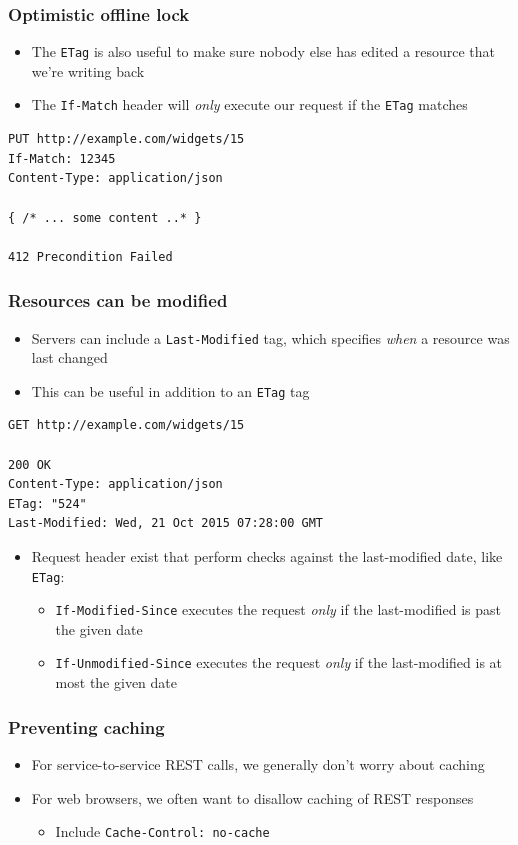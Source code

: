 \documentclass[8pt]{article}
\begin{document}
\subsubsection{Optimistic offline lock}
\label{sec:orgde41bcb}
\begin{itemize}
\item The \texttt{ETag} is also useful to make sure nobody else has edited a resource that we're writing back
\item The \texttt{If-Match} header will \emph{only} execute our request if the \texttt{ETag} matches
\end{itemize}
\begin{verbatim}
PUT http://example.com/widgets/15
If-Match: 12345
Content-Type: application/json

{ /* ... some content ..* }

412 Precondition Failed
\end{verbatim}
\subsubsection{Resources can be modified}
\label{sec:org8d68e75}
\begin{itemize}
\item Servers can include a \texttt{Last-Modified} tag, which specifies \emph{when} a resource was last changed
\item This can be useful in addition to an \texttt{ETag} tag
\end{itemize}
\begin{verbatim}
GET http://example.com/widgets/15

200 OK
Content-Type: application/json
ETag: "524"
Last-Modified: Wed, 21 Oct 2015 07:28:00 GMT
\end{verbatim}
\begin{itemize}
\item Request header exist that perform checks against the last-modified date, like \texttt{ETag}:
\begin{itemize}
\item \texttt{If-Modified-Since} executes the request \emph{only} if the last-modified is past the given date
\item \texttt{If-Unmodified-Since} executes the request \emph{only} if the last-modified is at most the given date
\end{itemize}
\end{itemize}
\subsubsection{Preventing caching}
\label{sec:org5233b06}
\begin{itemize}
\item For service-to-service REST calls, we generally don't worry about caching
\item For web browsers, we often want to disallow caching of REST responses
\begin{itemize}
\item Include \texttt{Cache-Control: no-cache}
\end{itemize}
\end{itemize}
\end{document}
